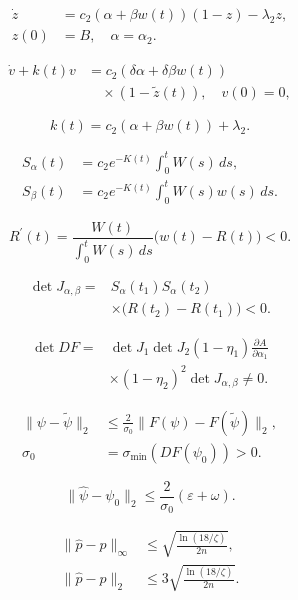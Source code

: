 \[
\begin{aligned}\dot z&=c_2(\alpha+\beta w(t))(1-z)-\lambda_2z,\\z(0)&=B,\quad\alpha=\alpha_2.\end{aligned}
\]

\[
\begin{aligned}\dot v+k(t)v&=c_2(\delta\alpha+\delta\beta w(t))\\&\quad\times(1-\widetilde z(t)),\quad v(0)=0,\end{aligned}
\]

\[
k(t)=c_2(\alpha+\beta w(t))+\lambda_2.
\]

\[
\begin{aligned}S_\alpha(t)&=c_2e^{-K(t)}\int_0^tW(s)\,ds,\\S_\beta(t)&=c_2e^{-K(t)}\int_0^tW(s)w(s)\,ds.\end{aligned}
\]

\[
R^{\prime}(t)=\frac{W(t)}{\int_0^t W(s)\,ds}\bigl(w(t)-R(t)\bigr)<0.
\]

\[
\begin{aligned}\det J_{\alpha,\beta}=&S_\alpha(t_1)S_\alpha(t_2)\\&\times\bigl(R(t_2)-R(t_1)\bigr)<0.\end{aligned}
\]

\[
\begin{aligned}\det DF=&\det J_1\det J_2(1-\eta_1)\frac{\partial A}{\partial\alpha_1}\\&\times(1-\eta_2)^2\det J_{\alpha,\beta}\ne0.\end{aligned}
\]

\[
\begin{aligned}\|\psi-\widetilde\psi\|_2&\le\frac{2}{\sigma_0}\|F(\psi)-F(\widetilde\psi)\|_2,\\\sigma_0&=\sigma_{\min}(DF(\psi_0))>0.\end{aligned}
\]

\[
\|\widehat\psi-\psi_0\|_2\le\frac{2}{\sigma_0}(\varepsilon+\omega).
\]

\[
\begin{aligned}\|\widehat p-p\|_\infty&\le\sqrt{\frac{\ln(18/\zeta)}{2n}},\\\|\widehat p-p\|_2&\le3\sqrt{\frac{\ln(18/\zeta)}{2n}}.\end{aligned}
\]